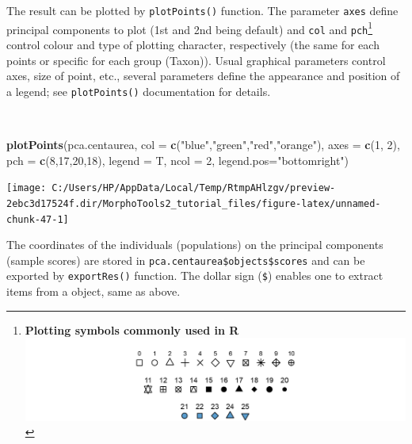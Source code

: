 \documentclass[
]{article}
\newenvironment{Shaded}{\begin{snugshade}}{\end{snugshade}}
\newcommand{\DataTypeTok}[1]{\textcolor[rgb]{0.13,0.29,0.53}{#1}}
\newcommand{\DecValTok}[1]{\textcolor[rgb]{0.00,0.00,0.81}{#1}}
\newcommand{\KeywordTok}[1]{\textcolor[rgb]{0.13,0.29,0.53}{\textbf{#1}}}
\newcommand{\NormalTok}[1]{#1}
\newcommand{\StringTok}[1]{\textcolor[rgb]{0.31,0.60,0.02}{#1}}
\begin{document}
The result can be plotted by \texttt{plotPoints()} function. The
parameter \texttt{axes} define principal components to plot (1st and 2nd
being default) and \texttt{col} and \texttt{pch}\footnote{\textbf{Plotting
  symbols commonly used in R}\\
  \includegraphics[width=1\textwidth,height=\textheight]{./pch.png}}
control colour and type of plotting character, respectively (the same
for each points or specific for each group (Taxon)). Usual graphical
parameters control axes, size of point, etc., several parameters define
the appearance and position of a legend; see \texttt{plotPoints()}
documentation for details.

~

\begin{Shaded}
\begin{Highlighting}[]
\KeywordTok{plotPoints}\NormalTok{(pca.centaurea, }\DataTypeTok{col =} \KeywordTok{c}\NormalTok{(}\StringTok{"blue"}\NormalTok{,}\StringTok{"green"}\NormalTok{,}\StringTok{"red"}\NormalTok{,}\StringTok{"orange"}\NormalTok{), }\DataTypeTok{axes =} \KeywordTok{c}\NormalTok{(}\DecValTok{1}\NormalTok{, }\DecValTok{2}\NormalTok{),}
           \DataTypeTok{pch =} \KeywordTok{c}\NormalTok{(}\DecValTok{8}\NormalTok{,}\DecValTok{17}\NormalTok{,}\DecValTok{20}\NormalTok{,}\DecValTok{18}\NormalTok{), }\DataTypeTok{legend =}\NormalTok{ T, }\DataTypeTok{ncol =} \DecValTok{2}\NormalTok{, }\DataTypeTok{legend.pos=}\StringTok{"bottomright"}\NormalTok{)}
\end{Highlighting}
\end{Shaded}

\begin{center}\texttt{[image: C:/Users/HP/AppData/Local/Temp/RtmpAHlzgv/preview-2ebc3d17524f.dir/MorphoTools2\_tutorial\_files/figure-latex/unnamed-chunk-47-1]} \end{center}

The coordinates of the individuals (populations) on the principal
components (sample scores) are stored in
\texttt{pca.centaurea\$objects\$scores} and can be exported by
\texttt{exportRes()} function. The dollar sign (\texttt{\$}) enables one
to extract items from a object, same as above.
\end{document}
